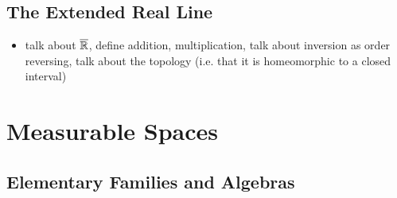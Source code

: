\documentclass{book}
\begin{document}
	
	
	
	
	
	
	
	
	
	
	
	
	
	
	
	
	
	
	
	
	
	
	\newpage
	\section{The Extended Real Line}
	
	\begin{itemize}
		\item talk about $\overline{\mathbb{R}}$, define addition, multiplication, talk about inversion as order reversing, talk about the topology (i.e. that it is homeomorphic to a closed interval)
	\end{itemize}
	
	
	
	
	
	
	
	
	
	
	
	
	
	
	
	
	
	
	
	
	
	
	
	
	
	
	
	
	
	
	
	
	
	
	
	
	
	
	
	
	
	
	
	
	
	
	
	\newpage
	
	\chapter{Measurable Spaces}
	
	
	\section{Elementary Families and Algebras}
	
\end{document}
